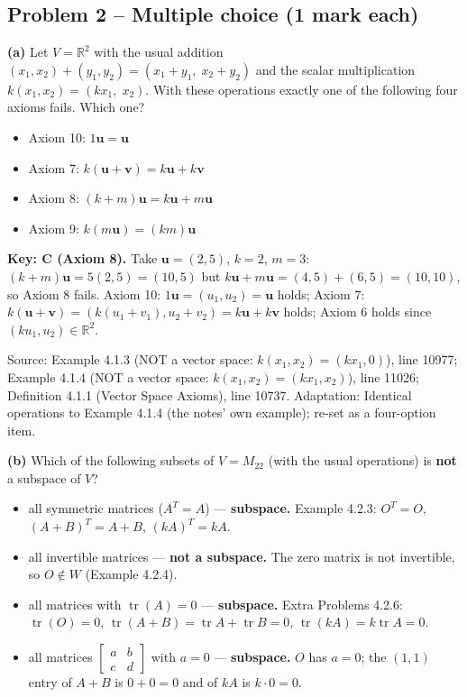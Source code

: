 \documentclass[11pt,a4paper]{article}
\newcommand{\Src}[1]{{\footnotesize\color{black!65}Source: #1}}
\begin{document}
\subsection*{Problem 2 -- Multiple choice (1 mark each)}
\textbf{(a)} Let $V=\mathbb{R}^2$ with the usual addition $(x_1,x_2)+(y_1,y_2)=(x_1+y_1,\;x_2+y_2)$ and the scalar multiplication $k(x_1,x_2)=(kx_1,\;x_2)$. With these operations exactly one of the following four axioms fails. Which one?\par
\begin{itemize}[leftmargin=8mm,itemsep=0pt]\item[A] Axiom 10: $1\mathbf{u}=\mathbf{u}$\item[B] Axiom 7: $k(\mathbf{u}+\mathbf{v})=k\mathbf{u}+k\mathbf{v}$\item[C$^{\ast}$] Axiom 8: $(k+m)\mathbf{u}=k\mathbf{u}+m\mathbf{u}$\item[D] Axiom 9: $k(m\mathbf{u})=(km)\mathbf{u}$\end{itemize}
\textbf{Key: C (Axiom 8).} Take $\mathbf{u}=(2,5)$, $k=2$, $m=3$: $(k+m)\mathbf{u}=5(2,5)=(10,5)$ but $k\mathbf{u}+m\mathbf{u}=(4,5)+(6,5)=(10,10)$, so Axiom 8 fails. Axiom 10: $1\mathbf{u}=(u_1,u_2)=\mathbf{u}$ holds; Axiom 7: $k(\mathbf{u}+\mathbf{v})=(k(u_1+v_1),u_2+v_2)=k\mathbf{u}+k\mathbf{v}$ holds; Axiom 6 holds since $(ku_1,u_2)\in\mathbb{R}^2$.\par
\Src{Example 4.1.3 (NOT a vector space: $k(x_1,x_2)=(kx_1,0)$), line 10977; Example 4.1.4 (NOT a vector space: $k(x_1,x_2)=(kx_1,x_2)$), line 11026; Definition 4.1.1 (Vector Space Axioms), line 10737. Adaptation: Identical operations to Example 4.1.4 (the notes' own example); re-set as a four-option item.}\par
{}\textbf{(b)} Which of the following subsets of $V=M_{22}$ (with the usual operations) is \textbf{not} a subspace of $V$?\par
\begin{itemize}[leftmargin=8mm,itemsep=0pt]\item[A] all symmetric matrices ($A^T=A$) --- \textbf{subspace.} Example 4.2.3: $O^T=O$, $(A+B)^T=A+B$, $(kA)^T=kA$.\item[B$^{\ast}$] all invertible matrices --- \textbf{not a subspace.} The zero matrix is not invertible, so $O\notin W$ (Example 4.2.4).\item[C] all matrices with $\operatorname{tr}(A)=0$ --- \textbf{subspace.} Extra Problems 4.2.6: $\operatorname{tr}(O)=0$, $\operatorname{tr}(A+B)=\operatorname{tr}A+\operatorname{tr}B=0$, $\operatorname{tr}(kA)=k\operatorname{tr}A=0$.\item[D] all matrices $\begin{bmatrix}a&b\\ c&d\end{bmatrix}$ with $a=0$ --- \textbf{subspace.} $O$ has $a=0$; the $(1,1)$ entry of $A+B$ is $0+0=0$ and of $kA$ is $k\cdot0=0$.\end{itemize}
\end{document}
